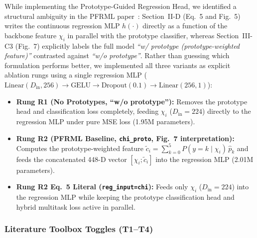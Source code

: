 \documentclass[conference]{IEEEtran}
\begin{document}
While implementing the Prototype-Guided Regression Head, we identified a
structural ambiguity in the PFRML
paper~\cite{wangPrototypeFeatureRepresentationGuided2026}: Section~II-D (Eq.~5
and Fig.~5) writes the continuous regression MLP $h(\cdot)$ directly as a
function of the backbone feature $\chi_i$ in parallel with the prototype
classifier, whereas Section~III-C3 (Fig.~7) explicitly labels the full model
\textit{``w/ prototype (prototype-weighted feature)''} contrasted against
\textit{``w/o prototype''}. Rather than guessing which formulation performs
better, we implemented all three variants as explicit ablation rungs using a
single regression MLP
($\text{Linear}(D_{\text{in}}, 256) \to \text{GELU} \to \text{Dropout}(0.1) \to \text{Linear}(256, 1)$):
\begin{itemize}
  \item \textbf{Rung R1 (No Prototypes, ``w/o prototype''):} Removes the
        prototype head and classification loss completely, feeding $\chi_i$
        ($D_{\text{in}} = 224$) directly to the regression MLP under pure MSE
        loss (1.95M parameters).
  \item \textbf{Rung R2 (PFRML Baseline, \texttt{chi\_proto}, Fig.~7
        interpretation):} Computes the prototype-weighted feature
        $\tilde{c}_i = \sum_{k=0}^{5} P(y = k \mid \chi_i)\,\hat{p}_k$ and feeds
        the concatenated 448-D vector $[\chi_i; \tilde{c}_i]$ into the
        regression MLP (2.01M parameters).
  \item \textbf{Rung R2 Eq.~5 Literal (\texttt{reg\_input=chi}):} Feeds only
        $\chi_i$ ($D_{\text{in}} = 224$) into the regression MLP while keeping
        the prototype classification head and hybrid multitask loss active in
        parallel.
\end{itemize}

\subsubsection{Literature Toolbox Toggles (T1--T4)}
\end{document}

